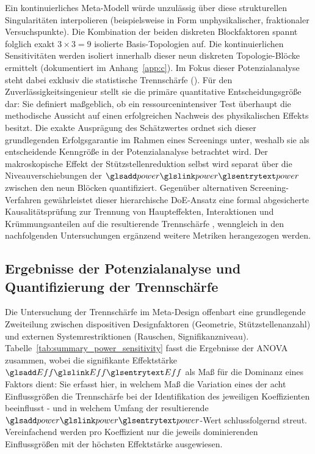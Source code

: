 Ein kontinuierliches Meta-Modell würde unzulässig über diese strukturellen Singularitäten interpolieren (beispielsweise in Form unphysikalischer, fraktionaler Versuchspunkte).
Die Kombination der beiden diskreten Blockfaktoren spannt folglich exakt $3 \times 3 = 9$ isolierte Basis-Topologien auf.
Die kontinuierlichen Sensitivitäten werden isoliert innerhalb dieser neun diskreten Topologie-Blöcke ermittelt (dokumentiert im Anhang~\ref{app:c}).
Im Fokus dieser Potenzialanalyse steht dabei exklusiv die statistische Trennschärfe ().
Für den Zuverlässigkeitsingenieur stellt sie die primäre quantitative Entscheidungsgröße dar: Sie definiert maßgeblich, ob ein ressourcenintensiver Test überhaupt die methodische Aussicht auf einen erfolgreichen Nachweis des physikalischen Effekts besitzt.
Die exakte Ausprägung des Schätzwertes ordnet sich dieser grundlegenden Erfolgsgarantie im Rahmen eines Screenings unter, weshalb sie als entscheidende Kenngröße in der Potenzialanalyse betrachtet wird.
Der makroskopische Effekt der Stützstellenreduktion selbst wird separat über die Niveauverschiebungen der $\sym{power}$ zwischen den neun Blöcken quantifiziert.
Gegenüber alternativen Screening-Verfahren gewährleistet dieser hierarchische \ac{DoE}-Ansatz eine formal abgesicherte Kausalitätsprüfung zur Trennung von Haupteffekten, Interaktionen und Krümmungsanteilen auf die resultierende Trennschärfe \cite{Kleppmann.2020,Zio.2013}, wenngleich in den nachfolgenden Untersuchungen ergänzend weitere Metriken herangezogen werden.


\subsection{Ergebnisse der Potenzialanalyse und Quantifizierung der Trennschärfe} \label{subsec:ergebnisse_sensitivitaet}

Die Untersuchung der Trennschärfe im Meta-Design offenbart eine grundlegende Zweiteilung zwischen dispositiven Designfaktoren (Geometrie, Stützstellenanzahl) und externen Systemrestriktionen (Rauschen, Signifikanzniveau).
Tabelle~\ref{tab:summary_power_sensitivity} fasst die Ergebnisse der \ac{ANOVA} zusammen, wobei die signifikante Effektstärke $\sym{Eff}$ als Maß für die Dominanz eines Faktors dient:
Sie erfasst hier, in welchem Maß die Variation eines der acht Einflussgrößen die Trennschärfe bei der Identifikation des jeweiligen Koeffizienten beeinflusst - und in welchem Umfang der resultierende $\sym{power}$-Wert schlussfolgernd streut.
Vereinfachend werden pro Koeffizient nur die jeweils dominierenden Einflussgrößen mit der höchsten Effektstärke ausgewiesen.

